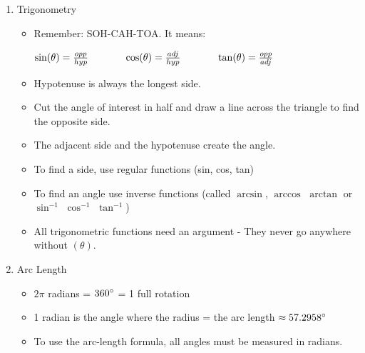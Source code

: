 \documentclass[letterpaper, 12pt]{article}
\begin{document}
\begin{enumerate}
\begin{itemize}
\begin{itemize}
				
			\end{itemize}
		\end{itemize}
	\vspace{.5 in} 
	\item Trigonometry
	\begin{itemize}
		\item Remember: SOH-CAH-TOA.  It means:
		\begin{center}
			$\sin(\theta) = \frac{opp}{hyp} \hspace{0.5in} \cos(\theta) = \frac{adj}{hyp} \hspace{0.5in} \tan(\theta) = \frac{opp}{adj}	$	
		\end{center}
	\item Hypotenuse is always the longest side.
	\item Cut the angle of interest in half and draw a line across the triangle to find the opposite side.
	\item The adjacent side and the hypotenuse create the angle.
	\item To find a side, use regular functions (sin, cos, tan)
	\item To find an angle use inverse functions (called $\arcsin$, $\arccos$ $\arctan$ or $\sin^{-1}$ $\cos^{-1}$ $\tan^{-1}$)
	\item All trigonometric functions need an argument - They never go anywhere without $(\theta)$.	
	\end{itemize}
	
	\item Arc Length
	\begin{itemize}
		\item $2\pi $ radians = $360 \degree $  = 1 full rotation
		\item 1 radian is the angle where the radius = the arc length $\approx 57.2958\degree$
		\item To use the arc-length formula, all angles must be measured in radians.
	\end{itemize}
\end{enumerate}
 
\end{document}
